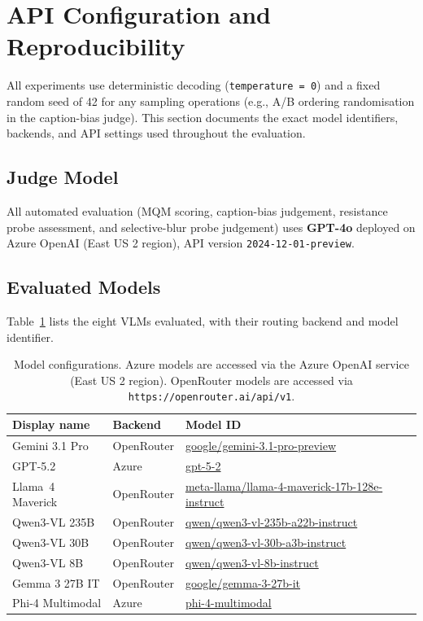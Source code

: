 \section{API Configuration and Reproducibility}
\label{sec:appendix-reproducibility}

All experiments use deterministic decoding (\texttt{temperature\,=\,0}) and a fixed random seed of 42 for any sampling operations (e.g., A/B ordering randomisation in the caption-bias judge). This section documents the exact model identifiers, backends, and API settings used throughout the evaluation.

\subsection{Judge Model}

All automated evaluation (MQM scoring, caption-bias judgement, resistance probe assessment, and selective-blur probe judgement) uses \textbf{GPT-4o} deployed on Azure OpenAI (East US 2 region), API version \texttt{2024-12-01-preview}.

\subsection{Evaluated Models}

Table~\ref{tab:model-config} lists the eight VLMs evaluated, with their routing backend and model identifier.

\begin{table}[t]
\centering
\footnotesize
\setlength{\tabcolsep}{6pt}
\begin{tabular}{@{}lll@{}}
\toprule
\textbf{Display name} & \textbf{Backend} & \textbf{Model ID} \\
\midrule
Gemini 3.1 Pro     & OpenRouter & \url{google/gemini-3.1-pro-preview} \\
GPT-5.2            & Azure      & \url{gpt-5-2} \\
Llama~4 Maverick   & OpenRouter & \url{meta-llama/llama-4-maverick-17b-128e-instruct} \\
Qwen3-VL 235B      & OpenRouter & \url{qwen/qwen3-vl-235b-a22b-instruct} \\
Qwen3-VL 30B       & OpenRouter & \url{qwen/qwen3-vl-30b-a3b-instruct} \\
Qwen3-VL 8B        & OpenRouter & \url{qwen/qwen3-vl-8b-instruct} \\
Gemma 3 27B IT     & OpenRouter & \url{google/gemma-3-27b-it} \\
Phi-4 Multimodal   & Azure      & \url{phi-4-multimodal} \\
\bottomrule
\end{tabular}
\caption{Model configurations. Azure models are accessed via the Azure OpenAI service (East US 2 region). OpenRouter models are accessed via \texttt{https://openrouter.ai/api/v1}.}
\label{tab:model-config}
\end{table}

